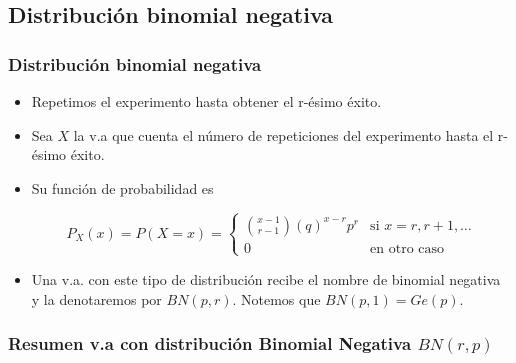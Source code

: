 \documentclass[handout]{beamer}\usepackage[]{graphicx}\usepackage[]{color}
\renewcommand{\emph}[1]{{\color{red}#1}}
\theoremstyle{plain}
\theoremstyle{definition}
\begin{document}
\subsection{Distribución binomial negativa}
\begin{frame}
\frametitle{Distribución binomial negativa}
\begin{itemize}
\item 
Repetimos el
experimento hasta obtener el r-ésimo éxito. 
\item Sea $X$ la v.a que
cuenta el número de repeticiones del experimento hasta el r-ésimo
éxito. 
\item Su función de probabilidad es

{\scriptsize
     $$P_{X}(x)=P(X=x)=\left\{\begin{array}{ll}
     {{x-1}\choose{r-1}} (q)^{x-r}p^r & \mbox{si } x=r,r+1,\ldots\\
     0 & \mbox{en otro caso}\end{array}\right.$$
}
\item
     Una v.a. con este tipo de distribución recibe el nombre de \emph{binomial negativa} y la denotaremos por $BN(p,r)$. Notemos que $BN(p,1)=Ge(p)$.
\end{itemize}

\end{frame}
\subsubsection{Resumen v.a con distribución Binomial Negativa $BN(r,p)$}
\end{document}
